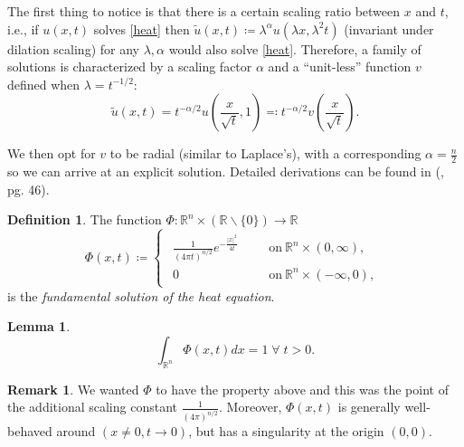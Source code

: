 \documentclass[openany, amssymb, psamsfonts]{amsart}
\newtheorem{lem}{Lemma}[section]
\theoremstyle{definition}
\newtheorem{defn}{Definition}[section]
\newtheorem{rem}{Remark}[section]
\numberwithin{equation}{section}
\newcommand{\bbr}{\mathbb{R}}
\let\oldforall\forall
\renewcommand{\forall}{\;\oldforall\; }
\begin{document}
The first thing to notice is that there is a certain scaling ratio between $x$ and $t$, i.e., if $u(x, t)$ solves \eqref{heat} then $\tilde{u}(x, t) \coloneqq \lambda^\alpha u(\lambda x, \lambda^2 t)$ (invariant under dilation scaling) for any $\lambda, \alpha$ would also solve \eqref{heat}. Therefore, a family of solutions is characterized by a scaling factor $\alpha$ and a ``unit-less'' function $v$ defined when $\lambda = t^{-1/2}$:
\begin{equation}
    \tilde{u}(x, t) = t^{-\alpha/2}u\left(\frac{x}{\sqrt{t}}, 1\right) \eqqcolon t^{-\alpha/2} v\left(\frac{x}{\sqrt{t}}\right) .
\end{equation}

We then opt for $v$ to be radial (similar to Laplace's), with a corresponding $\alpha = \frac{n}{2}$ so we can arrive at an explicit solution. Detailed derivations can be found in (\cite{Evans}, pg. 46).
\begin{defn} The function $\Phi: \bbr^n \times (\bbr \backslash \{0\}) \to \bbr$ \begin{equation} \label{heat_fund}
    \Phi(x, t) \coloneqq \begin{cases}
        \begin{aligned}
            \frac{1}{(4\pi t)^{n/2}}e ^{-\frac{|x|^2}{4t}} & &&\text{on} \: \bbr^n \times (0, \infty), \\
            0  & &&\text{on} \: \bbr^n \times (-\infty, 0),
        \end{aligned}
    \end{cases}
\end{equation}
is the \textit{fundamental solution of the heat equation}.
\end{defn}

\begin{lem} \label{conv_1}
\begin{equation*}
    \int_{\bbr^n} \Phi(x, t) dx = 1 \forall t > 0.
\end{equation*}
\end{lem}
\begin{rem}
    We wanted $\Phi$ to have the property above and this was the point of the additional scaling constant $\frac{1}{(4\pi)^{n/2}}$. Moreover, $\Phi(x, t)$ is generally well-behaved around $(x \neq 0, t \to 0)$, but has a singularity at the origin $(0, 0)$.
\end{rem}
\end{document}
